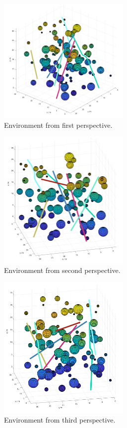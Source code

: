 \documentclass[journal]{IEEEtran}
\begin{document}
	\begin{figure}[h]
			\centering
			\includegraphics[width=2.5in]{Results/Potentialfields/env_1}
			\caption{Environment from first perspective.}
			\label{fig:env_1}
		\end{figure}	
		\begin{figure}[h]
			\centering
			\includegraphics[width=2.5in]{Results/Potentialfields/env_2}
			\caption{Environment from second perspective.}
			\label{fig:env_2}
		\end{figure}	
		\begin{figure}[h]
			\centering
			\includegraphics[width=2.5in]{Results/Potentialfields/env_3}
			\caption{Environment from third perspective.}
			\label{fig:env_3}
		\end{figure}	
\end{document}
